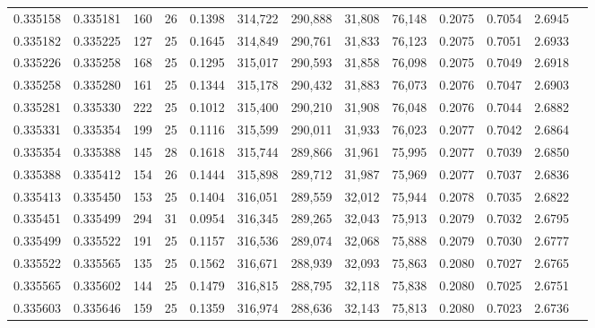 \begin{tabular}{rrrrrrrrrrrrr}
0.335158 & 0.335181 &   160 &  26 &                                     0.1398 & 314,722 & 290,888 &  31,808 &  76,148 & 0.2075 & 0.7054 & 2.6945 \\
0.335182 & 0.335225 &   127 &  25 &                                     0.1645 & 314,849 & 290,761 &  31,833 &  76,123 & 0.2075 & 0.7051 & 2.6933 \\
0.335226 & 0.335258 &   168 &  25 &                                     0.1295 & 315,017 & 290,593 &  31,858 &  76,098 & 0.2075 & 0.7049 & 2.6918 \\
0.335258 & 0.335280 &   161 &  25 &                                     0.1344 & 315,178 & 290,432 &  31,883 &  76,073 & 0.2076 & 0.7047 & 2.6903 \\
0.335281 & 0.335330 &   222 &  25 &                                     0.1012 & 315,400 & 290,210 &  31,908 &  76,048 & 0.2076 & 0.7044 & 2.6882 \\
0.335331 & 0.335354 &   199 &  25 &                                     0.1116 & 315,599 & 290,011 &  31,933 &  76,023 & 0.2077 & 0.7042 & 2.6864 \\
0.335354 & 0.335388 &   145 &  28 &                                     0.1618 & 315,744 & 289,866 &  31,961 &  75,995 & 0.2077 & 0.7039 & 2.6850 \\
0.335388 & 0.335412 &   154 &  26 &                                     0.1444 & 315,898 & 289,712 &  31,987 &  75,969 & 0.2077 & 0.7037 & 2.6836 \\
0.335413 & 0.335450 &   153 &  25 &                                     0.1404 & 316,051 & 289,559 &  32,012 &  75,944 & 0.2078 & 0.7035 & 2.6822 \\
0.335451 & 0.335499 &   294 &  31 &                                     0.0954 & 316,345 & 289,265 &  32,043 &  75,913 & 0.2079 & 0.7032 & 2.6795 \\
0.335499 & 0.335522 &   191 &  25 &                                     0.1157 & 316,536 & 289,074 &  32,068 &  75,888 & 0.2079 & 0.7030 & 2.6777 \\
0.335522 & 0.335565 &   135 &  25 &                                     0.1562 & 316,671 & 288,939 &  32,093 &  75,863 & 0.2080 & 0.7027 & 2.6765 \\
0.335565 & 0.335602 &   144 &  25 &                                     0.1479 & 316,815 & 288,795 &  32,118 &  75,838 & 0.2080 & 0.7025 & 2.6751 \\
0.335603 & 0.335646 &   159 &  25 &                                     0.1359 & 316,974 & 288,636 &  32,143 &  75,813 & 0.2080 & 0.7023 & 2.6736 \\

\end{tabular}
